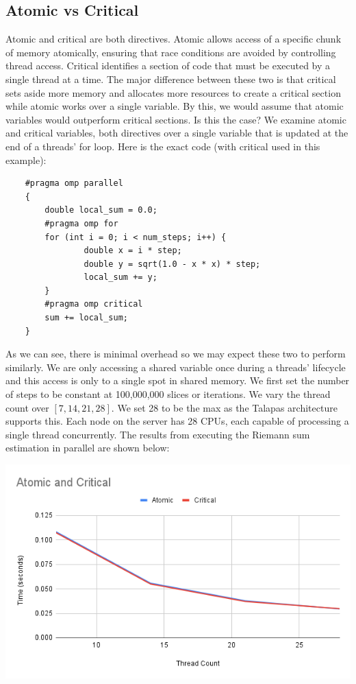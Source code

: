 \documentclass{article}
\begin{document}
\begin{multicols}{2}
\section{Atomic vs Critical}
Atomic and critical are both directives. Atomic allows access of a specific chunk of memory atomically, ensuring that race conditions are avoided by controlling thread access. Critical identifies a section of code that must be executed by a single thread at a time. The major difference between these two is that critical sets aside more memory and allocates more resources to create a critical section while atomic works over a single variable. By this, we would assume that atomic variables would outperform critical sections. Is this the case?
We examine atomic and critical variables, both directives over a single variable that is updated at the end of a threads' for loop. Here is the exact code (with critical used in this example):
\begin{lstlisting}
    #pragma omp parallel
    {
        double local_sum = 0.0;
        #pragma omp for
        for (int i = 0; i < num_steps; i++) {
                double x = i * step;
                double y = sqrt(1.0 - x * x) * step;
                local_sum += y;
        }
        #pragma omp critical
        sum += local_sum;
    }
\end{lstlisting}
As we can see, there is minimal overhead so we may expect these two to perform similarly. We are only accessing a shared variable once during a threads' lifecycle and this access is only to a single spot in shared memory. We first set the number of steps to be constant at 100,000,000 slices or iterations. We vary the thread count over $[7, 14, 21, 28]$. We set 28 to be the max as the Talapas architecture supports this. Each node on the server has 28 CPUs, each capable of processing a single thread concurrently. The results from executing the Riemann sum estimation in parallel are shown below:

\includegraphics[width=\linewidth]{Images/actc.png}


\end{multicols}
\end{document}
